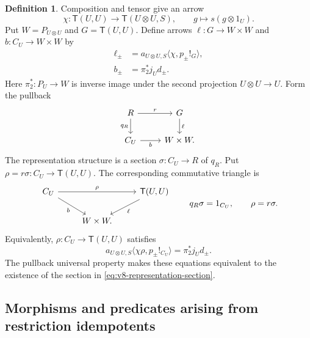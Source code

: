\documentclass[11pt]{article}
\theoremstyle{definition}
\newtheorem{definition}[theorem]{Definition}
\theoremstyle{remark}
\begin{document}
\begin{definition}
Composition and tensor give an arrow
\[
 \chi:\mathsf T(U,U)\longrightarrow \mathsf T(U\otimes U,S),
 \qquad g\longmapsto s(g\otimes1_U).
\]
Put $W=P_{U\otimes U}$ and $G=\mathsf T(U,U)$. Define arrows
$\ell:G\to W\times W$ and $b:C_U\to W\times W$ by
\begin{align*}
 \ell_\pm&=a_{U\otimes U,S}\langle\chi,p_\pm!_G\rangle,\\
 b_\pm&=\pi_2^*j_Ud_\pm.
\end{align*}
Here $\pi_2^*:P_U\to W$ is inverse image under the second
projection $U\otimes U\to U$. Form the pullback
\begin{equation}\label{eq:v8-representation-pullback}
\begin{tikzcd}
 R \arrow[r, "r"] \arrow[d, "q_R"'] & G \arrow[d, "\ell"]\\
 C_U \arrow[r, "b"'] & W\times W.
\end{tikzcd}
\end{equation}
The representation structure is a section $\sigma:C_U\to R$ of $q_R$.
Put $\rho=r\sigma:C_U\to \mathsf T(U,U)$. The corresponding commutative
triangle is
\begin{equation}\label{eq:v8-representation-section}
\begin{tikzcd}
 C_U \arrow[rr, "\rho"] \arrow[dr, "b"'] && \mathsf T(U,U)
     \arrow[dl, "\ell"]\\
 & W\times W. &
\end{tikzcd}
\qquad q_R\sigma=1_{C_U},\qquad \rho=r\sigma.
\end{equation}
Equivalently, $\rho:C_U\to \mathsf T(U,U)$ satisfies
\begin{equation}\label{eq:generalized-algebra-representation}
 a_{U\otimes U,S}\langle\chi\rho,p_\pm!_{C_U}\rangle
   =\pi_2^*j_Ud_\pm.
\end{equation}
The pullback universal property makes these equations equivalent
to the existence of the section in
\eqref{eq:v8-representation-section}.
\end{definition}

\subsection{Morphisms and predicates arising from restriction idempotents}
\label{sec:definability-morphisms}
\end{document}
